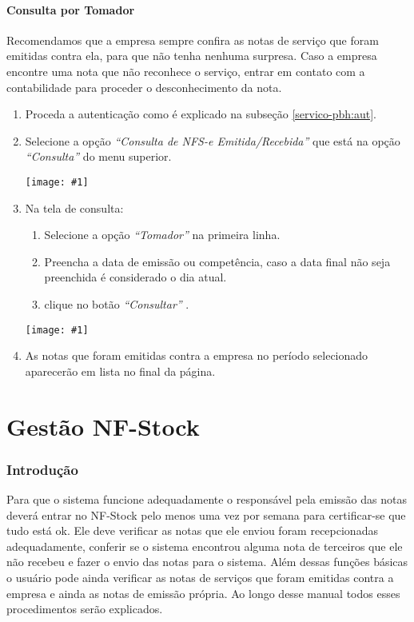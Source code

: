 \documentclass{article}
\newcommand{\itasp}[1]{
  \textit{``#1''}
}
\newcommand{\imagem}[2]{
  \begin{center}
    \texttt{[image: \#1]}
  \end{center}
}
\newcommand{\parte}[1]{
  \pagebreak
  \vfill
  \partfont{\centering}
  \vspace*{\fill}
    \part{#1}    
  \vspace*{\fill}
  \vfill
  \pagebreak
}
\begin{document}
\subsection{Consulta por Tomador}
\label{servico-pbh:tomador}
Recomendamos que a empresa sempre confira as notas de serviço que foram emitidas contra ela, para que não tenha nenhuma surpresa. Caso a empresa encontre uma nota que não reconhece o serviço, entrar em contato com a contabilidade para proceder o desconhecimento da nota.
  \begin{enumerate}
    \item Proceda a autenticação como é explicado na subseção \ref{servico-pbh:aut}.
    \item Selecione a opção \itasp{Consulta de NFS-e Emitida/Recebida} que está na opção \itasp{Consulta} do menu superior. \imagem{consulta-nota-menu}{0.5}
    \item Na tela de consulta:
    \begin{enumerate}[label*=\arabic*.]
      \item Selecione a opção \itasp{Tomador} na primeira linha.
      \item Preencha a data de emissão ou competência, caso a data final não seja preenchida é considerado o dia atual.
      \item clique no botão \itasp{Consultar}.
    \end{enumerate}
    \imagem{consulta-nfse}{0.7}
    \item As notas que foram emitidas contra a empresa no período selecionado aparecerão em lista no final da página.
  \end{enumerate}

  \parte{Gestão NF-Stock}
  \section{Introdução}
  \label{sec:intro-nfstock}
  
  Para que o sistema funcione adequadamente o responsável pela emissão das notas deverá entrar no NF-Stock pelo menos uma vez por semana para certificar-se que tudo está ok. Ele deve verificar as notas que ele enviou foram recepcionadas adequadamente, conferir se o sistema encontrou alguma nota de terceiros que ele não recebeu e fazer o envio das notas para o sistema. Além dessas funções básicas o usuário pode ainda verificar as notas de serviços que foram emitidas contra a empresa e ainda as notas de emissão própria. Ao longo desse manual todos esses procedimentos serão explicados.
  
\end{document}
